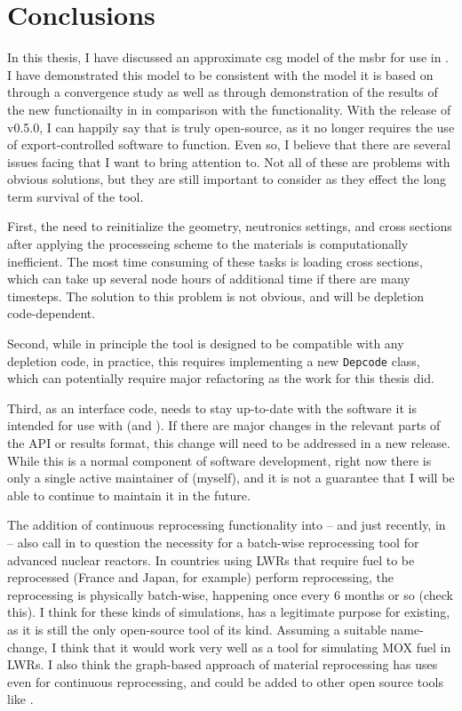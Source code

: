 \chapter{Conclusions}
\label{ch:chapter6}

In this thesis, I have discussed an approximate \Gls{csg} model of the
\Gls{msbr} for use in \OpenMC. I have demonstrated this model to be consistent
with the \SerpentTWO model it is based on through a convergence study as well as
through demonstration of the results of the new \OpenMC functionailty in
\SaltProc in comparison with the \SerpentTWO functionality.
With the release of v0.5.0, I can happily say that \SaltProc is truly
open-source, as it no longer requires the use of export-controlled software
to function. Even so, I believe that there are several issues facing \SaltProc
that I want to bring attention to. Not all of these are problems with obvious
solutions, but they are still important to consider as they effect the long
term survival of the tool.

First, the need to reinitialize the geometry, neutronics
settings, and cross sections after applying the processeing scheme to the
materials is computationally inefficient. The most time consuming of these tasks
is loading cross sections, which can take up several node hours of additional
time if there are many timesteps. The solution to this problem is not obvious,
and will be depletion code-dependent.

Second, while in principle the tool is
designed to be compatible with any depletion code, in practice, this requires
implementing a new \verb.Depcode. class, which can potentially require major
refactoring as the work for this thesis did.

Third, as an interface code, \SaltProc needs to stay up-to-date with the
software it is intended for use with (\OpenMC and \SerpentTWO). If there are
major changes in the relevant parts of the API or results format, this change
will need to be addressed in a new \SaltProc release. While this is a normal
component of software development, right now there is only a single active
maintainer of \SaltProc (myself), and it is not a guarantee that I will
be able to continue to maintain it in the future.

The addition of continuous reprocessing functionality into \SerpentTWO -- and 
just recently, in  \OpenMC -- also call in to question the necessity for a
batch-wise reprocessing tool for advanced nuclear reactors. In countries using
LWRs that require fuel to be reprocessed (France and Japan, for example) perform
reprocessing, the reprocessing is physically batch-wise, happening once every 6
months or so (check this). I think for these kinds of simulations, \SaltProc
has a legitimate purpose for existing, as it is still the only open-source tool
of its kind. Assuming a suitable name-change, I think that it would work very
well as a tool for simulating MOX fuel in LWRs. I also think the graph-based
approach of material reprocessing has uses even for continuous reprocessing,
and could be added to other open source tools like \OpenMC.
